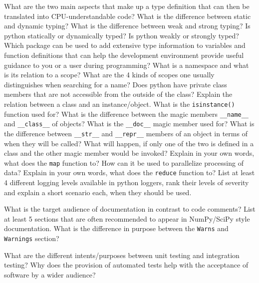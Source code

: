 \documentclass[]{erlangen-problemset}
\begin{document}
\begin{problem}[title={Python}]
\noindent
\Question What are the two main aspects that make up a type definition that can then be translated into CPU-understandable code?
\Question What is the difference between static and dynamic typing? What is the difference between weak and strong typing? Is python statically or dynamically typed? Is python weakly or strongly typed?
\Question Which package can be used to add extensive type information to variables and function definitions that can help the development environment provide useful guidance to you or a user during programming?
\Question What is a namespace and what is its relation to a scope?
\Question What are the 4 kinds of scopes one usually distinguishes when searching for a name?
\Question Does python have private class members that are not accessible from the outside of the class?
\Question Explain the relation between a class and an instance/object.
\Question What is the \texttt{isinstance()} function used for?
\Question What is the difference between the magic members \texttt{\_\_name\_\_} and  \texttt{\_\_class\_\_} of objects?
\Question What is the  \texttt{\_\_doc\_\_} magic member used for?
\Question What is the difference between  \texttt{\_\_str\_\_} and  \texttt{\_\_repr\_\_} members of an object in terms of when they will be called? What will happen, if only one of the two is defined in a class and the other magic member would be invoked?
\Question Explain in your own words, what does the \texttt{map} function to? How can it be used to parallelize processing of data?
\Question Explain in your own words, what does the \texttt{reduce} function to? 
\Question List at least 4 different logging levels available in python loggers, rank their levels of severity and explain a short scenario each, when they should be used. 
\end{problem}


\begin{problem}[title={Documentation}]
\noindent
\Question What is the target audience of documentation in contrast to code comments?
\Question List at least 5 sections that are often recommended to appear in NumPy/SciPy style documentation.
\Question What is the difference in purpose between the \texttt{Warns} and \texttt{Warnings} section?

\end{problem}

\begin{problem}[title={Testing}]
\noindent
\Question What are the different intents/purposes between unit testing and integration testing?
\Question Why does the provision of automated tests help with the acceptance of software by a wider audience?
\end{problem}
\end{document}
